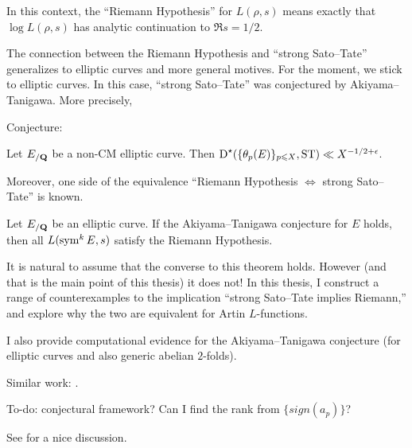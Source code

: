 In this context, the ``Riemann Hypothesis'' for $L(\rho,s)$ means exactly that 
$\log L(\rho,s)$ has analytic continuation to $\Re s=1/2$. 

The connection between the Riemann Hypothesis and ``strong Sato--Tate'' 
generalizes to elliptic curves and more general motives. For the moment, we 
stick to elliptic curves. In this case, ``strong Sato--Tate'' was conjectured 
by Akiyama--Tanigawa. More precisely, 

Conjecture:

Let $E_{/\mathbf{Q}}$ be a non-CM elliptic curve. Then 
$\operatorname{D}^\star(\{\theta_p(E)\}_{p\leqslant X}, \mathrm{ST}) \ll X^{-1/2+\epsilon}$. 


Moreover, one side of the equivalence ``Riemann Hypothesis $\Leftrightarrow$ 
strong Sato--Tate'' is known. 

\begin{theorem}
Let $E_{/\mathbf{Q}}$ be an elliptic curve. If the Akiyama--Tanigawa conjecture for 
$E$ holds, then all $L(\operatorname{sym}^k E, s)$ satisfy the Riemann Hypothesis. 
\end{theorem}

It is natural to assume that the converse to this theorem holds. However (and 
that is the main point of this thesis) it does not! In this thesis, I construct 
a range of counterexamples to the implication ``strong Sato--Tate implies 
Riemann,'' and explore why the two are equivalent for Artin $L$-functions. 

I also provide computational evidence for the Akiyama--Tanigawa conjecture 
(for elliptic curves and also generic abelian $2$-folds). 

Similar work: \cite{pande-2011}. 

To-do: conjectural framework? Can I find the rank from $\{sign(a_p)\}$?

See \cite{mazur-2008} for a nice discussion. 
